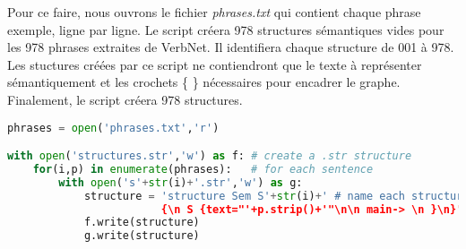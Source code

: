Pour ce faire, nous ouvrons le fichier \emph{phrases.txt} qui contient chaque phrase exemple, ligne par ligne. Le script créera 978 structures sémantiques vides pour les 978 phrases extraites de VerbNet. Il identifiera chaque structure de 001 à 978. Les stuctures créées par ce script ne contiendront que le texte à représenter sémantiquement et les crochets \{ \} nécessaires pour encadrer le graphe. Finalement, le script créera 978 structures.

\begin{lstlisting}[language=Python, caption = Code pour créer les structures sémantiques vides, label=structurepython]
phrases = open('phrases.txt','r')

with open('structures.str','w') as f: # create a .str structure
    for(i,p) in enumerate(phrases):   # for each sentence
        with open('s'+str(i)+'.str','w') as g:
            structure = 'structure Sem S'+str(i)+' # name each structure by enumeration
						{\n S {text="'+p.strip()+'"\n\n main-> \n }\n}' # insert as texte the sentence
            f.write(structure)
            g.write(structure)
\end{lstlisting}

